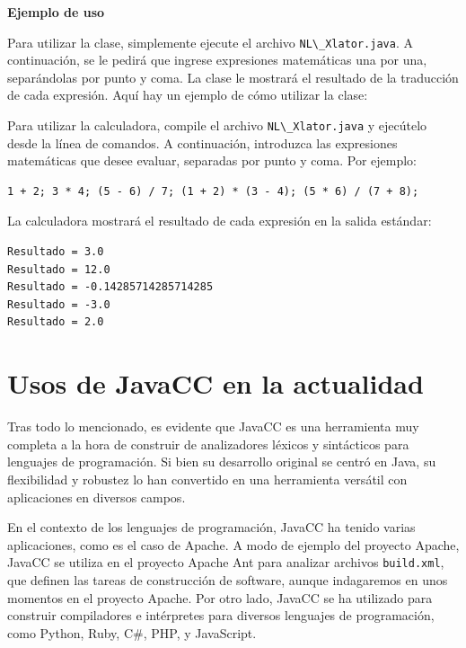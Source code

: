 \noindent \textbf{Ejemplo de uso}

\phantom{text}

\noindent Para utilizar la clase, simplemente ejecute el archivo \lstinline|NL\_Xlator.java|. A continuación, se le pedirá que ingrese expresiones matemáticas una por una, separándolas por punto y coma. La clase le mostrará el resultado de la traducción de cada expresión.
Aquí hay un ejemplo de cómo utilizar la clase:


Para utilizar la calculadora, compile el archivo \lstinline|NL\_Xlator.java| y ejecútelo desde la línea de comandos. A continuación, introduzca las expresiones matemáticas que desee evaluar, separadas por punto y coma. Por ejemplo:

\begin{lstlisting}
1 + 2; 3 * 4; (5 - 6) / 7; (1 + 2) * (3 - 4); (5 * 6) / (7 + 8);
\end{lstlisting}

La calculadora mostrará el resultado de cada expresión en la salida estándar:

\begin{lstlisting}
Resultado = 3.0
Resultado = 12.0
Resultado = -0.14285714285714285
Resultado = -3.0
Resultado = 2.0
\end{lstlisting}

\section{Usos de JavaCC en la actualidad}

\noindent Tras todo lo mencionado, es evidente que JavaCC es una herramienta muy completa a la hora de construir de analizadores léxicos y sintácticos para lenguajes de programación. Si bien su desarrollo original se centró en Java, su flexibilidad y robustez lo han convertido en una herramienta versátil con aplicaciones en diversos campos.

En el contexto de los lenguajes de programación, JavaCC ha tenido varias aplicaciones, como es el caso de Apache. A modo de ejemplo del proyecto Apache, JavaCC se utiliza en el proyecto Apache Ant para analizar archivos  \lstinline|build.xml|, que definen las tareas de construcción de software\cite{apache}, aunque indagaremos en unos momentos en el proyecto Apache. Por otro lado, JavaCC se ha utilizado para construir compiladores e intérpretes para diversos lenguajes de programación, como Python, Ruby, C\#, PHP, y JavaScript\cite{javaccc++preprocessor}.

